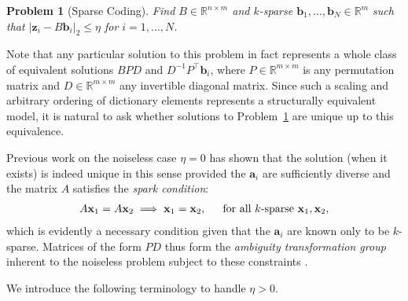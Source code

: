 \documentclass[journal, twocolumn]{IEEEtran}
\newtheorem{problem}{Problem}
\begin{document}
\begin{problem}[Sparse Coding]\label{InverseProblem}
Find $B \in \mathbb{R}^{n \times m}$ and $k$-sparse $\mathbf{b}_1, \ldots, \mathbf{b}_N \in \mathbb{R}^m$ such that $|\mathbf{z}_i - B\mathbf{b}_i|_2 \leq \eta$ for $i = 1, \ldots, N$.
\end{problem}

Note that any particular solution to this problem in fact represents a whole class of equivalent solutions $BPD$ and $D^{-1}P^{\top}\mathbf{b}_i$, where $P \in \mathbb{R}^{m \times m}$ is any permutation matrix and $D \in \mathbb{R}^{m \times m}$ any invertible diagonal matrix. Since such a scaling and arbitrary ordering of dictionary elements represents a structurally equivalent model, it is natural to ask whether solutions to Problem~\ref{InverseProblem} are unique up to this equivalence.

Previous work \cite{li2004analysis, Georgiev05, Aharon06, Hillar15} on the noiseless case $\eta = 0$ has shown that the solution (when it exists) is indeed unique in this sense provided the $\mathbf{a}_i$ are sufficiently diverse and the matrix $A$ satisfies the \textit{spark condition}:
\begin{align}\label{SparkCondition}
A\mathbf{x}_1 = A\mathbf{x}_2 \implies \mathbf{x}_1 = \mathbf{x}_2,\indent \text{for all $k$-sparse } \mathbf{x}_1, \mathbf{x}_2,
\end{align}
%
which is evidently a necessary condition given that the $\mathbf{a}_i$ are known only to be $k$-sparse. 
Matrices of the form $PD$ thus form the \emph{ambiguity transformation group} inherent to the noiseless problem subject to these constraints \cite{Li15}. 

We introduce the following terminology to handle $\eta > 0$.

\end{document}
